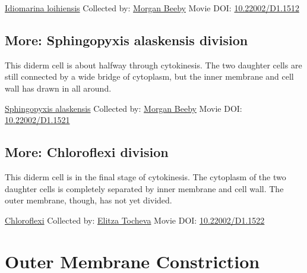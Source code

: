 \documentclass[]{tufte-book}
\begin{document}
\hypertarget{htmlwidget-5dbefe9f2c3556154c47}{}

\label{fig:5-6}\protect\hyperlink{tree}{Idiomarina loihiensis} Collected by: \protect\hyperlink{morgan_beeby}{Morgan Beeby} Movie DOI: \href{https://doi.org/10.22002/D1.1512}{10.22002/D1.1512}

\hypertarget{Sphingopyxis_alaskensis_division}{%
\subsection*{More: Sphingopyxis alaskensis division}\label{Sphingopyxis_alaskensis_division}}

This diderm cell is about halfway through cytokinesis. The two daughter cells are still connected by a wide bridge of cytoplasm, but the inner membrane and cell wall has drawn in all around.



\hypertarget{htmlwidget-a87f7849b8855293310a}{}

\label{fig:5-6a}\protect\hyperlink{tree}{Sphingopyxis alaskensis} Collected by: \protect\hyperlink{morgan_beeby}{Morgan Beeby} Movie DOI: \href{https://doi.org/10.22002/D1.1521}{10.22002/D1.1521}

\hypertarget{Chloroflexi_division}{%
\subsection*{More: Chloroflexi division}\label{Chloroflexi_division}}

This diderm cell is in the final stage of cytokinesis. The cytoplasm of the two daughter cells is completely separated by inner membrane and cell wall. The outer membrane, though, has not yet divided.



\hypertarget{htmlwidget-5c010862553ee921dc63}{}

\label{fig:5-6b}\protect\hyperlink{tree}{Chloroflexi} Collected by: \protect\hyperlink{elitza_tocheva}{Elitza Tocheva} Movie DOI: \href{https://doi.org/10.22002/D1.1522}{10.22002/D1.1522}

\hypertarget{outer-membrane-constriction}{%
\section{Outer Membrane Constriction}\label{outer-membrane-constriction}}
\end{document}
